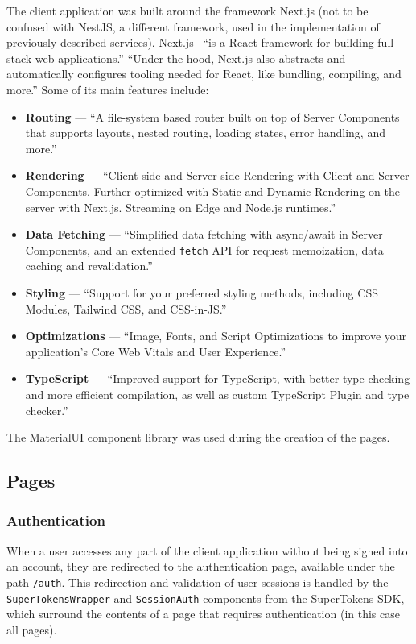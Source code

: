 The client application was built around the framework Next.js (not to be confused with NestJS, a different framework, used in the implementation of previously described services). Next.js~\cite{next_js} \enquote{is a React framework for building full-stack web applications.} \enquote{Under the hood, Next.js also abstracts and automatically configures tooling needed for React, like bundling, compiling, and more.} Some of its main features include:
\begin{itemize}
    \item \textbf{Routing} --- \enquote{A file-system based router built on top of Server Components that supports layouts, nested routing, loading states, error handling, and more.}
    \item \textbf{Rendering} --- \enquote{Client-side and Server-side Rendering with Client and Server Components. Further optimized with Static and Dynamic Rendering on the server with Next.js. Streaming on Edge and Node.js runtimes.}
    \item \textbf{Data Fetching} --- \enquote{Simplified data fetching with async/await in Server Components, and an extended \texttt{fetch} API for request memoization, data caching and revalidation.}
    \item \textbf{Styling} --- \enquote{Support for your preferred styling methods, including CSS Modules, Tailwind CSS, and CSS-in-JS.}
    \item \textbf{Optimizations} --- \enquote{Image, Fonts, and Script Optimizations to improve your application's Core Web Vitals and User Experience.}
    \item \textbf{TypeScript} --- \enquote{Improved support for TypeScript, with better type checking and more efficient compilation, as well as custom TypeScript Plugin and type checker.}
\end{itemize}

The MaterialUI component library was used during the creation of the pages.

\subsection{Pages}

\fboxsep=0pt

\subsubsection{Authentication}

When a user accesses any part of the client application without being signed into an account, they are redirected to the authentication page, available under the path \texttt{/auth}. This redirection and validation of user sessions is handled by the \texttt{SuperTokensWrapper} and \texttt{SessionAuth} components from the SuperTokens SDK, which surround the contents of a page that requires authentication (in this case all pages).

